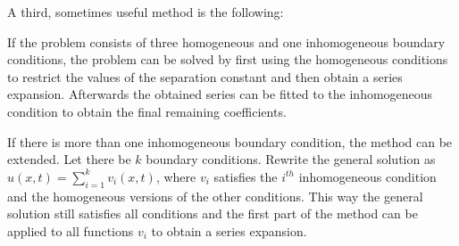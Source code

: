     A third, sometimes useful method is the following:
    \begin{method}
        If the problem consists of three homogeneous and one inhomogeneous boundary conditions, the problem can be solved by first using the homogeneous conditions to restrict the values of the separation constant and then obtain a series expansion. Afterwards the obtained series can be fitted to the inhomogeneous condition to obtain the final remaining coefficients.

        If there is more than one inhomogeneous boundary condition, the method can be extended. Let there be $k$ boundary conditions. Rewrite the general solution as $u(x,t) = \sum_{i=1}^kv_i(x,t)$, where $v_i$ satisfies the $i^{th}$ inhomogeneous condition and the homogeneous versions of the other conditions. This way the general solution still satisfies all conditions and the first part of the method can be applied to all functions $v_i$ to obtain a series expansion.
    \end{method}

